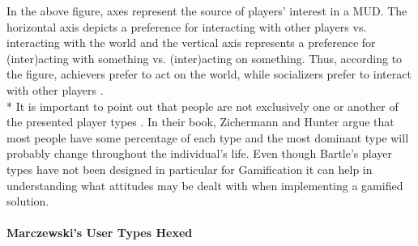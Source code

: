 In the above figure, axes represent the source of players' interest in a MUD. The horizontal axis depicts a preference for interacting with other players vs. interacting with the world and the vertical axis represents a preference for (inter)acting with something vs. (inter)acting on something. Thus, according to the figure, achievers prefer to act on the world, while socializers prefer to interact with other players \cite{bartle}. \\*
It is important to point out that people are not exclusively one or another of the presented player types \cite{zichermann2011gamification}. In their book, Zichermann and Hunter argue that most people have some percentage of each type and the most dominant type will probably change throughout the individual's life. Even though Bartle's player types have not been designed in particular for Gamification it can  help in understanding what attitudes may be dealt with when implementing a gamified solution. 

\paragraph{Marczewski's User Types Hexed}


